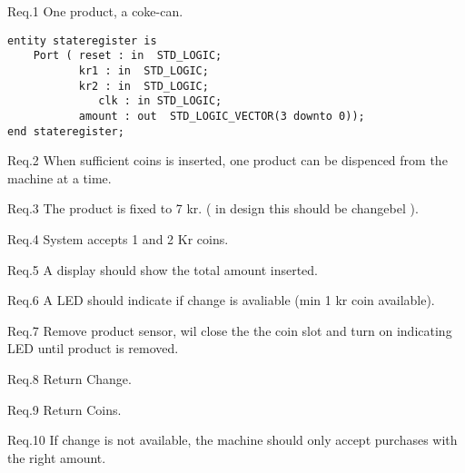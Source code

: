 
Req.1 One product, a coke-can.
\begin{lstlisting}
entity stateregister is
    Port ( reset : in  STD_LOGIC;
           kr1 : in  STD_LOGIC;
           kr2 : in  STD_LOGIC;
			  clk : in STD_LOGIC;
           amount : out  STD_LOGIC_VECTOR(3 downto 0));
end stateregister;
\end{lstlisting}


Req.2 When sufficient coins is inserted, one product can be dispenced from the machine at a time.
  
Req.3 The product is fixed to 7 kr. ( in design this should be changebel ).

Req.4 System accepts 1 and 2 Kr coins.
 
Req.5 A display should show the total amount inserted.
  
Req.6 A LED should indicate if change is avaliable (min 1 kr coin available).
 
Req.7 Remove product sensor, wil close the the coin slot and turn on indicating LED until product is removed.  

Req.8 Return Change.
 
Req.9 Return Coins.

Req.10 If change is not available, the machine should only accept purchases with the right amount.

